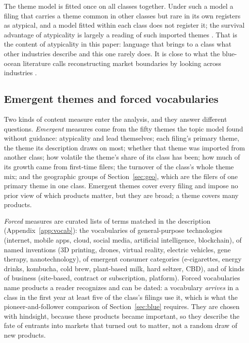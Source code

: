 The theme model is fitted once on all classes together. Under such a
model a filing that carries a theme common in other classes but rare in
its own registers as atypical, and a model fitted within each class does
not register it; the survival advantage of atypicality is largely a
reading of such imported themes \citep{SilverCorpus2026}. That is the
content of atypicality in this paper: language that brings to a class
what other industries describe and this one rarely does. It is close to
what the blue-ocean literature calls reconstructing market boundaries by
looking across industries \citep{KimMauborgne2004}.

\subsection{Emergent themes and forced vocabularies}\label{sec:themes}

Two kinds of content measure enter the analysis, and they answer
different questions. \emph{Emergent} measures come from the fifty themes
the topic model found without guidance: atypicality and lead
themselves; each filing's primary theme, the theme its description
draws on most; whether that theme was imported from another class;
how volatile the theme's share of its class has been; how much of its
growth came from first-time filers; the turnover of the class's whole
theme mix; and the geographic groups of Section~\ref{sec:geo}, which
are the filers of one primary theme in one class. Emergent themes cover
every filing and impose no prior view of which products matter, but they
are broad; a theme covers many products.

\emph{Forced} measures are curated lists of terms matched in the
description (Appendix~\ref{app:vocab}): the vocabularies of
general-purpose technologies (internet, mobile apps, cloud, social
media, artificial intelligence, blockchain), of named inventions (3D
printing, drones, virtual reality, electric vehicles, gene therapy,
nanotechnology), of emergent consumer categories (e-cigarettes, energy
drinks, kombucha, cold brew, plant-based milk, hard seltzer, CBD), and
of kinds of business (site-based, contract or subscription, platform).
Forced vocabularies name products a reader recognizes and can be dated:
a vocabulary \emph{arrives} in a class in the first year at least five
of the class's filings use it, which is what the pioneer-and-follower
comparison of Section~\ref{sec:blue} requires. They are chosen with
hindsight, because these products became important, so they describe
the fate of entrants into markets that turned out to matter, not a
random draw of new products.

